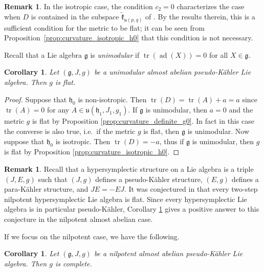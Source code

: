 \documentclass{article}
\newtheorem{corollary}[theorem]{Corollary}
\theoremstyle{definition}
\newtheorem{remark}[theorem]{Remark}
\DeclareMathOperator{\ad}{ad}
\newcommand{\frg}{\mathfrak{g}}
\newcommand{\frh}{\mathfrak{h}}
\newcommand{\lie}[1]{\mathfrak{#1}}
\DeclareMathOperator{\Tr}{tr}
\begin{document}
\begin{remark}\label{remark:freibertflat}
    In the isotropic case, the condition $c_2=0$ characterizes the case when $D$ is contained in the subspace $\tilde{\lie k}_{\lie u(p,q)}$ of \cite{Freibert24_TFHS}. By the results therein, this is a sufficient condition for the metric to be flat; it can be seen from Proposition~\ref{prop:curvature_isotropic_h0} that this condition is not necessary.
\end{remark}

Recall that a Lie algebra $\frg$ is \emph{unimodular} if $\Tr(\ad(X))=0$ for all $X\in\frg$.

\begin{corollary}\label{cor:flat_almost_ab_pK}
    Let $(\frg,J,g)$ be a unimodular almost abelian pseudo-Kähler Lie algebra. Then $g$ is flat.
\end{corollary}

\begin{proof}
    Suppose that $\frh_0$ is non-isotropic. Then $\Tr(D)=\Tr(A)+a=a$ since $\Tr(A)=0$ for any $A\in\mathfrak{u}(\frh_1,J_1,g_1)$. If $\frg$ is unimodular, then $a=0$ and the metric $g$ is flat by Proposition \ref{prop:curvature_definite_g0}. In fact in this case the converse is also true, i.e.\ if the metric $g$ is flat, then $\frg$ is unimodular. Now suppose that $\frh_0$ is isotropic. Then $\Tr(D)=-a$, thus if $\frg$ is unimodular, then $g$ is flat by Proposition \ref{prop:curvature_isotropic_h0}.
\end{proof}

\begin{remark}\label{remark:hypersymplectic}
    Recall that a hypersymplectic structure on a Lie algebra is a triple $(J,E,g)$ such that $(J,g)$ defines a pseudo-K\"ahler structure, $(E,g)$ defines a para-K\"ahler structure, and $JE=-EJ$. It was conjectured in \cite[Conjecture 4.24]{CG25} that every two-step nilpotent hypersymplectic Lie algebra is flat. Since every hypersymplectic Lie algebra is in particular pseudo-Kähler, Corollary \ref{cor:flat_almost_ab_pK} gives a positive answer to this conjecture in the nilpotent almost abelian case.
\end{remark}

If we focus on the nilpotent case, we have the following.

\begin{corollary}\label{cor:completeness}
    Let $(\frg,J,g)$ be a nilpotent almost abelian pseudo-Kähler Lie algebra. Then $g$ is complete.
\end{corollary}
\end{document}
